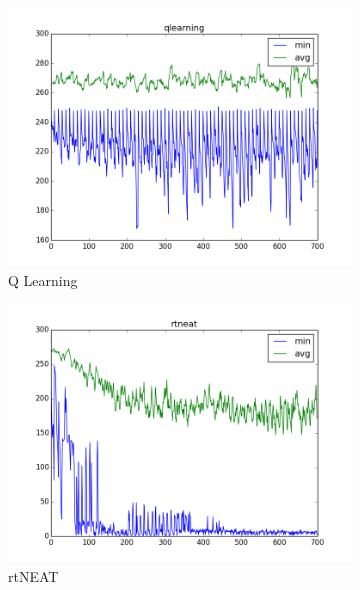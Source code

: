 \documentclass[letterpaper]{article}
\begin{document}
\begin{figure}[ht]
\centering
\begin{subfigure}{0.7\columnwidth}
  \centering
  \includegraphics[width=\columnwidth]{wall_qlearning.png}
  \caption{Q Learning}
  \label{fig:wall_q}
\end{subfigure}%
\begin{subfigure}{0.7\columnwidth}
  \centering
  \includegraphics[width=\columnwidth]{wall_rtneat.png}
  \caption{rtNEAT}
  \label{fig:wall_neat}
\end{subfigure}
\begin{subfigure}{0.7\columnwidth}
  \centering

\end{subfigure}
\end{figure}
\end{document}
